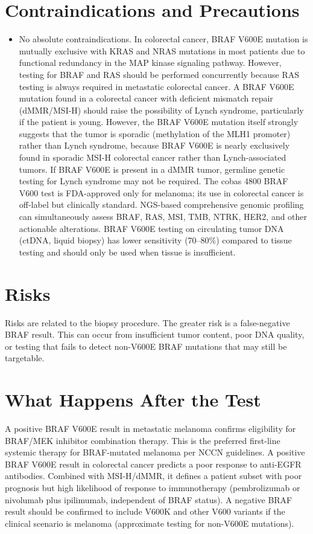 \section*{Contraindications and Precautions}
\begin{itemize}
  \item No absolute contraindications. In colorectal cancer, BRAF V600E mutation is mutually exclusive with KRAS and NRAS mutations in most patients due to functional redundancy in the MAP kinase signaling pathway. However, testing for BRAF and RAS should be performed concurrently because RAS testing is always required in metastatic colorectal cancer. A BRAF V600E mutation found in a colorectal cancer with deficient mismatch repair (dMMR/MSI-H) should raise the possibility of Lynch syndrome, particularly if the patient is young. However, the BRAF V600E mutation itself strongly suggests that the tumor is sporadic (methylation of the MLH1 promoter) rather than Lynch syndrome, because BRAF V600E is nearly exclusively found in sporadic MSI-H colorectal cancer rather than Lynch-associated tumors. If BRAF V600E is present in a dMMR tumor, germline genetic testing for Lynch syndrome may not be required. The cobas 4800 BRAF V600 test is FDA-approved only for melanoma; its use in colorectal cancer is off-label but clinically standard. NGS-based comprehensive genomic profiling can simultaneously assess BRAF, RAS, MSI, TMB, NTRK, HER2, and other actionable alterations. BRAF V600E testing on circulating tumor DNA (ctDNA, liquid biopsy) has lower sensitivity (70--80\%) compared to tissue testing and should only be used when tissue is insufficient.
\end{itemize}
\section*{Risks}
Risks are related to the biopsy procedure. The greater risk is a false-negative BRAF result. This can occur from insufficient tumor content, poor DNA quality, or testing that fails to detect non-V600E BRAF mutations that may still be targetable.

\section*{What Happens After the Test}
A positive BRAF V600E result in metastatic melanoma confirms eligibility for BRAF/MEK inhibitor combination therapy. This is the preferred first-line systemic therapy for BRAF-mutated melanoma per NCCN guidelines. A positive BRAF V600E result in colorectal cancer predicts a poor response to anti-EGFR antibodies. Combined with MSI-H/dMMR, it defines a patient subset with poor prognosis but high likelihood of response to immunotherapy (pembrolizumab or nivolumab plus ipilimumab, independent of BRAF status). A negative BRAF result should be confirmed to include V600K and other V600 variants if the clinical scenario is melanoma (approximate testing for non-V600E mutations).


